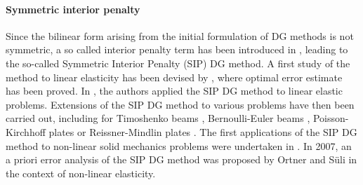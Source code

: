 
%
%

\paragraph{Symmetric interior penalty}

Since the bilinear form
arising from the initial formulation of DG methods is not symmetric, a so called interior
penalty term has been introduced in \cite{wheeler_elliptic_1978},
leading to the so-called Symmetric Interior Penalty (SIP) DG method. A first study
of the method to linear elasticity has been devised by
\cite{riviere_optimal_2000}, where optimal error estimate has been
proved.
%
%
%
In \cite{lew_optimal_2004}, the authors applied the SIP DG method to
linear elastic problems.
Extensions of the SIP DG method to various problems have then been carried out, including for Timoshenko beams
\cite{celiker_locking-free_2006}, Bernoulli-Euler beams \cite{brenner_balancing_1999},
Poisson-Kirchhoff plates \cite{engel_continuousdiscontinuous_2002} or Reissner-Mindlin plates
\cite{arnold_family_2005}.
The first applications of the SIP DG method to non-linear solid mechanics problems were undertaken in
\cite{ten_eyck_discontinuous_2006, noels_general_2006}.
In 2007, an a priori error analysis of the SIP DG method was proposed by Ortner and Süli \cite{ortner_discontinuous_2007}
in the context of non-linear elasticity.

